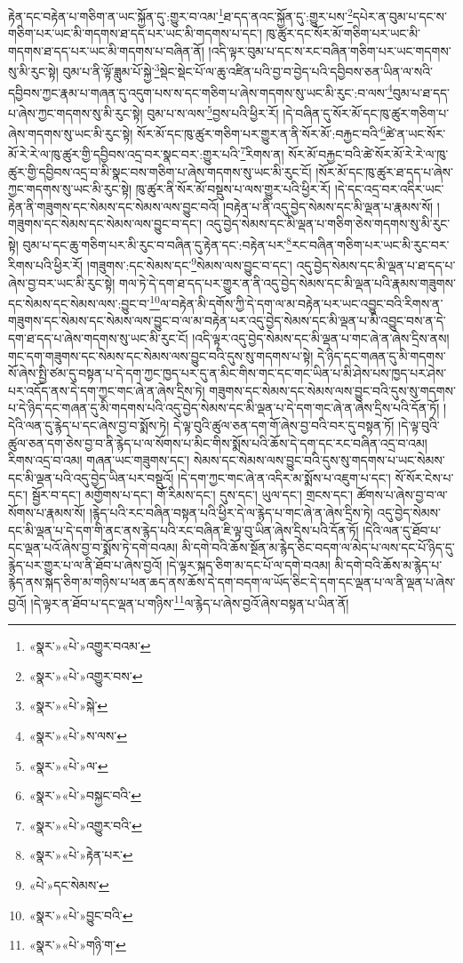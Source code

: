 རྟེན་དང་བརྟེན་པ་གཅིག་ན་ཡང་སྐྱོན་དུ་:གྱུར་བ་འམ་\footnote{«སྣར་»«པེ་»འགྱུར་བའམ་}ཐ་དད་ནའང་སྐྱོན་དུ་:གྱུར་པས་\footnote{«སྣར་»«པེ་»འགྱུར་བས་}དཔེར་ན་བུམ་པ་དང་ས་གཅིག་པར་ཡང་མི་གདགས་ཐ་དད་པར་ཡང་མི་གདགས་པ་དང་། ཁུ་ཚུར་དང་སོར་མོ་གཅིག་པར་ཡང་མི་གདགས་ཐ་དད་པར་ཡང་མི་གདགས་པ་བཞིན་ནོ། །འདི་ལྟར་བུམ་པ་དང་ས་རང་བཞིན་གཅིག་པར་ཡང་གདགས་སུ་མི་རུང་སྟེ། བུམ་པ་ནི་ལྟོ་ཟླུམ་པོ་སྐྱེ་\footnote{«སྣར་»«པེ་»སྐེ་}སྡེང་སྡེང་པོ་ལ་ཆུ་འཛིན་པའི་བྱ་བ་བྱེད་པའི་དབྱིབས་ཅན་ཡིན་ལ་སའི་དབྱིབས་ཀྱང་རྣམ་པ་གཞན་དུ་འདུག་པས་ས་དང་གཅིག་པ་ཞེས་གདགས་སུ་ཡང་མི་རུང་:བ་ལས་\footnote{«སྣར་»«པེ་»ས་ལས་}བུམ་པ་ཐ་དད་པ་ཞེས་ཀྱང་གདགས་སུ་མི་རུང་སྟེ། བུམ་པ་ས་ལས་\footnote{«སྣར་»«པེ་»ལ་}བྱས་པའི་ཕྱིར་རོ། །དེ་བཞིན་དུ་སོར་མོ་དང་ཁུ་ཚུར་གཅིག་པ་ཞེས་གདགས་སུ་ཡང་མི་རུང་སྟེ། སོར་མོ་དང་ཁུ་ཚུར་གཅིག་པར་གྱུར་ན་ནི་སོར་མོ་:བརྐྱང་བའི་\footnote{«སྣར་»«པེ་»བསྐྱང་བའི་}ཚེ་ན་ཡང་སོར་མོ་རེ་རེ་ལ་ཁུ་ཚུར་གྱི་དབྱིབས་འདྲ་བར་སྣང་བར་:གྱུར་པའི་\footnote{«སྣར་»«པེ་»འགྱུར་བའི་}རིགས་ན། སོར་མོ་བརྐྱང་བའི་ཚེ་སོར་མོ་རེ་རེ་ལ་ཁུ་ཚུར་གྱི་དབྱིབས་འདྲ་བ་མི་སྣང་བས་གཅིག་པ་ཞེས་གདགས་སུ་ཡང་མི་རུང་ངོ། །སོར་མོ་དང་ཁུ་ཚུར་ཐ་དད་པ་ཞེས་ཀྱང་གདགས་སུ་ཡང་མི་རུང་སྟེ། ཁུ་ཚུར་ནི་སོར་མོ་བསྡུས་པ་ལས་གྱུར་པའི་ཕྱིར་རོ། །དེ་དང་འདྲ་བར་འདིར་ཡང་རྟེན་ནི་གཟུགས་དང་སེམས་དང་སེམས་ལས་བྱུང་བའོ། །བརྟེན་པ་ནི་འདུ་བྱེད་སེམས་དང་མི་ལྡན་པ་རྣམས་སོ། །གཟུགས་དང་སེམས་དང་སེམས་ལས་བྱུང་བ་དང་། འདུ་བྱེད་སེམས་དང་མི་ལྡན་པ་གཅིག་ཅེས་གདགས་སུ་མི་རུང་སྟེ། བུམ་པ་དང་ཆུ་གཅིག་པར་མི་རུང་བ་བཞིན་དུ་རྟེན་དང་:བརྟེན་པར་\footnote{«སྣར་»«པེ་»རྟེན་པར་}རང་བཞིན་གཅིག་པར་ཡང་མི་རུང་བར་རིགས་པའི་ཕྱིར་རོ། །གཟུགས་:དང་སེམས་དང་\footnote{«པེ་»དང་སེམས་}སེམས་ལས་བྱུང་བ་དང་། འདུ་བྱེད་སེམས་དང་མི་ལྡན་པ་ཐ་དད་པ་ཞེས་བྱ་བར་ཡང་མི་རུང་སྟེ། གལ་ཏེ་དེ་དག་ཐ་དད་པར་གྱུར་ན་ནི་འདུ་བྱེད་སེམས་དང་མི་ལྡན་པའི་རྣམས་གཟུགས་དང་སེམས་དང་སེམས་ལས་:བྱུང་བ་\footnote{«སྣར་»«པེ་»བྱུང་བའི་}ལ་བརྟེན་མི་དགོས་ཀྱི་དེ་དག་ལ་མ་བརྟེན་པར་ཡང་འབྱུང་བའི་རིགས་ན་གཟུགས་དང་སེམས་དང་སེམས་ལས་བྱུང་བ་ལ་མ་བརྟེན་པར་འདུ་བྱེད་སེམས་དང་མི་ལྡན་པ་མི་འབྱུང་བས་ན་དེ་དག་ཐ་དད་པ་ཞེས་གདགས་སུ་ཡང་མི་རུང་ངོ། །འདི་ལྟར་འདུ་བྱེད་སེམས་དང་མི་ལྡན་པ་གང་ཞེ་ན་ཞེས་དྲིས་ནས། གང་དག་གཟུགས་དང་སེམས་དང་སེམས་ལས་བྱུང་བའི་དུས་སུ་གདགས་པ་སྟེ། དེ་ཉིད་དང་གཞན་དུ་མི་གདགས་སོ་ཞེས་སྤྱི་ཙམ་དུ་བསྟན་པ་དེ་དག་ཀྱང་ཁྱད་པར་དུ་ན་མིང་གིས་གང་དང་གང་ཡིན་པ་མི་ཤེས་པས་ཁྱད་པར་ཤེས་པར་འདོད་ནས་དེ་དག་ཀྱང་གང་ཞེ་ན་ཞེས་དྲིས་ཏེ། གཟུགས་དང་སེམས་དང་སེམས་ལས་བྱུང་བའི་དུས་སུ་གདགས་པ་དེ་ཉིད་དང་གཞན་དུ་མི་གདགས་པའི་འདུ་བྱེད་སེམས་དང་མི་ལྡན་པ་དེ་དག་གང་ཞེ་ན་ཞེས་དྲིས་པའི་དོན་ཏོ། །དེའི་ལན་དུ་རྙེད་པ་དང་ཞེས་བྱ་བ་སྨོས་ཏེ། དེ་ལྟ་བུའི་ཚུལ་ཅན་དག་གོ་ཞེས་བྱ་བའི་བར་དུ་བསྟན་ཏོ། །དེ་ལྟ་བུའི་ཚུལ་ཅན་དག་ཅེས་བྱ་བ་ནི་རྙེད་པ་ལ་སོགས་པ་མིང་གིས་སྨོས་པའི་ཆོས་དེ་དག་དང་རང་བཞིན་འདྲ་བ་འམ། རིགས་འདྲ་བ་འམ། གཞན་ཡང་གཟུགས་དང་། སེམས་དང་སེམས་ལས་བྱུང་བའི་དུས་སུ་གདགས་པ་ཡང་སེམས་དང་མི་ལྡན་པའི་འདུ་བྱེད་ཡིན་པར་བསྡུའོ། །དེ་དག་ཀྱང་གང་ཞེ་ན་འདིར་མ་སྨོས་པ་འཇུག་པ་དང་། སོ་སོར་ངེས་པ་དང་། སྦྱོར་བ་དང་། མགྱོགས་པ་དང་། གོ་རིམས་དང་། དུས་དང་། ཡུལ་དང་། གྲངས་དང་། ཚོགས་པ་ཞེས་བྱ་བ་ལ་སོགས་པ་རྣམས་སོ། །རྙེད་པའི་རང་བཞིན་བསྟན་པའི་ཕྱིར་དེ་ལ་རྙེད་པ་གང་ཞེ་ན་ཞེས་དྲིས་ཏེ། འདུ་བྱེད་སེམས་དང་མི་ལྡན་པ་དེ་དག་གི་ནང་ནས་རྙེད་པའི་རང་བཞིན་ཇི་ལྟ་བུ་ཡིན་ཞེས་དྲིས་པའི་དོན་ཏོ། །དེའི་ལན་དུ་ཐོབ་པ་དང་ལྡན་པའོ་ཞེས་བྱ་བ་སྨོས་ཏེ་དགེ་བའམ། མི་དགེ་བའི་ཆོས་སྔོན་མ་རྙེད་ཅིང་བདག་ལ་མེད་པ་ལས་དང་པོ་ཉིད་དུ་རྙེད་པར་གྱུར་པ་ལ་ནི་ཐོབ་པ་ཞེས་བྱའོ། །དེ་ལྟར་སྐད་ཅིག་མ་དང་པོ་ལ་དགེ་བའམ། མི་དགེ་བའི་ཆོས་མ་རྙེད་པ་རྙེད་ནས་སྐད་ཅིག་མ་གཉིས་པ་ཕན་ཆད་ནས་ཆོས་དེ་དག་བདག་ལ་ཡོད་ཅིང་དེ་དག་དང་ལྡན་པ་ལ་ནི་ལྡན་པ་ཞེས་བྱའོ། །དེ་ལྟར་ན་ཐོབ་པ་དང་ལྡན་པ་གཉིས་\footnote{«སྣར་»«པེ་»གཉི་ག་}ལ་རྙེད་པ་ཞེས་བྱའོ་ཞེས་བསྟན་པ་ཡིན་ནོ། 